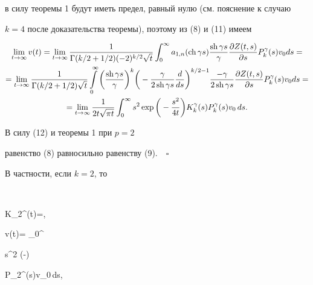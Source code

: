 в силу теоремы 1 будут иметь предел, равный нулю (см. пояснение к случаю


$k=4$ после доказательства теоремы), поэтому из (8) и (11) имеем


\begin{multline}


\lim_{t\to\infty}v(t)=\lim_{t\to\infty}


\frac{1}{\Gamma(k/2+1/2)(-2)^{k/2}\sqrt{t}}


\int_0^\infty


a_{1,n}(\ch \gamma s) \frac{\sh \gamma s}{\gamma}


\frac{\partial Z(t,s)}{\partial s} P_k^\gamma(s)v_0 ds=\\


%


=\lim_{t\to\infty}\frac{1}{\Gamma(k/2+1/2) \sqrt{t}}


\int\limits_0^\infty


\bigg(\frac{\sh \gamma s}{\gamma}\bigg )^k


\bigg(-\frac{\gamma}{2 \sh \gamma s} \frac{d}{ds}\bigg )^{k/2-1}


\frac{-\gamma}{2 \sh \gamma s}


\frac{\partial Z(t,s)}{\partial s} P_k^\gamma(s)v_0 ds=\\


%


=\lim_{t\to\infty}\frac{1}{2t \sqrt{\pi t}}


\int_0^\infty s^2 \exp\bigg (-\frac{s^2}{4t}\bigg )


K_k^\gamma(s) P_k^\gamma(s)v_0\,ds.


\end{multline}





В силу (12) и теоремы 1 при $p=2$


равенство (8) равносильно равенству (9).$\quad\square$


\medskip





В частности, если $k=2$, то


$$


K_2^\gamma(t)=,\quad


v(t)= \int_0^\infty


s^2 \exp\bigg (-\bigg ) 


P_2^\gamma(s)v_0\,ds,



